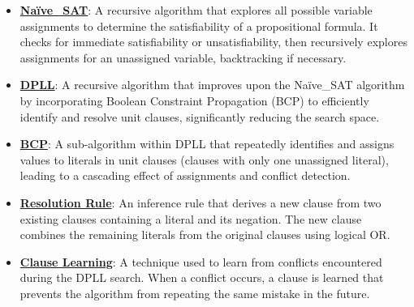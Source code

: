 \documentclass{article}%
\begin{document}
\begin{itemize}[leftmargin=*]%
\item \href{https://purdue.brightspace.com/d2l/common/assets/pdfjs-d2l-dist/1.0.14-legacy/web/viewer.html?file=\%2Fcontent\%2Fenforced\%2F1095467-wl.202510.CS.24300.001\%2F15L2-SAT.pdf\%3Fou\%3D1095467\&lang=en-us\&container=d2l-fileviewer-rendered-pdf\&fullscreen=d2l-fileviewer-rendered-pdf-dialog\&height=667#page=18}{\textbf{Naïve\_SAT}}: A recursive algorithm that explores all possible variable assignments to determine the satisfiability of a propositional formula. It checks for immediate satisfiability or unsatisfiability, then recursively explores assignments for an unassigned variable, backtracking if necessary.%
\item \href{https://purdue.brightspace.com/d2l/common/assets/pdfjs-d2l-dist/1.0.14-legacy/web/viewer.html?file=\%2Fcontent\%2Fenforced\%2F1095467-wl.202510.CS.24300.001\%2F15L2-SAT.pdf\%3Fou\%3D1095467\&lang=en-us\&container=d2l-fileviewer-rendered-pdf\&fullscreen=d2l-fileviewer-rendered-pdf-dialog\&height=667#page=17}{\textbf{DPLL}}: A recursive algorithm that improves upon the Naïve_SAT algorithm by incorporating Boolean Constraint Propagation (BCP) to efficiently identify and resolve unit clauses, significantly reducing the search space.%
\item \href{https://purdue.brightspace.com/d2l/common/assets/pdfjs-d2l-dist/1.0.14-legacy/web/viewer.html?file=\%2Fcontent\%2Fenforced\%2F1095467-wl.202510.CS.24300.001\%2F15L2-SAT.pdf\%3Fou\%3D1095467\&lang=en-us\&container=d2l-fileviewer-rendered-pdf\&fullscreen=d2l-fileviewer-rendered-pdf-dialog\&height=667#page=20}{\textbf{BCP}}: A sub-algorithm within DPLL that repeatedly identifies and assigns values to literals in unit clauses (clauses with only one unassigned literal), leading to a cascading effect of assignments and conflict detection.%
\item \href{https://purdue.brightspace.com/d2l/common/assets/pdfjs-d2l-dist/1.0.14-legacy/web/viewer.html?file=\%2Fcontent\%2Fenforced\%2F1095467-wl.202510.CS.24300.001\%2F15L2-SAT.pdf\%3Fou\%3D1095467\&lang=en-us\&container=d2l-fileviewer-rendered-pdf\&fullscreen=d2l-fileviewer-rendered-pdf-dialog\&height=667#page=32}{\textbf{Resolution Rule}}: An inference rule that derives a new clause from two existing clauses containing a literal and its negation. The new clause combines the remaining literals from the original clauses using logical OR.%
\item \href{https://purdue.brightspace.com/d2l/common/assets/pdfjs-d2l-dist/1.0.14-legacy/web/viewer.html?file=\%2Fcontent\%2Fenforced\%2F1095467-wl.202510.CS.24300.001\%2F15L2-SAT.pdf\%3Fou\%3D1095467\&lang=en-us\&container=d2l-fileviewer-rendered-pdf\&fullscreen=d2l-fileviewer-rendered-pdf-dialog\&height=667#page=35}{\textbf{Clause Learning}}: A technique used to learn from conflicts encountered during the DPLL search. When a conflict occurs, a clause is learned that prevents the algorithm from repeating the same mistake in the future.%
\end{itemize}%
\end{document}
